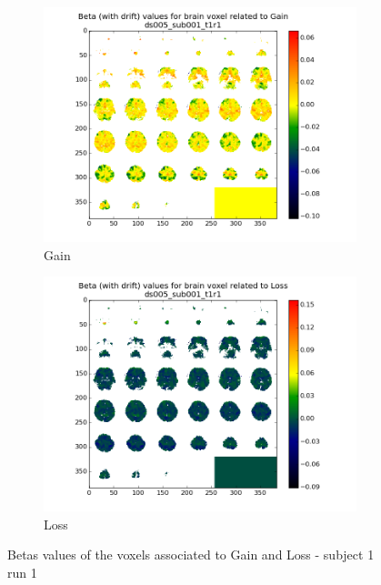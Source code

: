 \begin{figure}[H]
\begin{subfigure}{.5\textwidth}
  \centering
  \includegraphics[width=.9\linewidth]{../fig/mosaic/ds005_sub001_t1r1_withdrift_Gain.png}
  \caption{Gain}
  \label{fig:sfig1}
\end{subfigure}%
\begin{subfigure}{.5\textwidth}
  \centering
  \includegraphics[width=.9\linewidth]{../fig/mosaic/ds005_sub001_t1r1_withdrift_Loss.png}
  \caption{Loss}
  \label{fig:sfig2}
\end{subfigure}
\caption{Betas values of the voxels associated to Gain and Loss - subject 1 run 1}
\label{fig:fig}
\end{figure}

